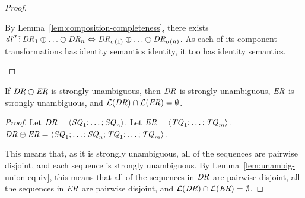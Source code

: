 \documentclass[numbers,10pt,preprint\ifanon ,nocopyrightspace\fi]{sigplanconf}
\begin{document}
\begin{proof}
\begin{case}[$j>0$]
    By Lemma~\ref{lem:composition-completeness},
    there exists $\mathit{dl}'' \,\tilde{:}\,
    \mathit{DR}_1 \oplus \ldots \oplus \mathit{DR}_n
    \Leftrightarrow
    \mathit{DR}_{\sigma(1)} \oplus \ldots \oplus \mathit{DR}_{\sigma(n)}$.
    As each of its component transformations has identity semantics identity,
    it too has identity semantics.
  \end{case}
\end{proof}

\begin{lemma}
  \label{lem:or-prop-subcomponent}
  If $\mathit{DR} \oplus \mathit{ER}$ is strongly unambiguous, then
  $\mathit{DR}$ is strongly unambiguous, $\mathit{ER}$ is strongly unambiguous,
  and $\mathcal{L}(\mathit{DR}) \cap \mathcal{L}(\mathit{ER}) = \emptyset$.
\end{lemma}
\begin{proof}
  Let $\mathit{DR} = \langle\mathit{SQ}_1;\ldots;\mathit{SQ}_n\rangle$.
  Let $\mathit{ER} = \langle\mathit{TQ}_1;\ldots;\mathit{TQ}_m\rangle$.
  $\mathit{DR} \oplus \mathit{ER} =
  \langle\mathit{SQ}_1;\ldots;\mathit{SQ}_n;\mathit{TQ}_1;\ldots;\mathit{TQ}_m\rangle$.

  This means that, as it is strongly unambiguous, all of the sequences are
  pairwise disjoint, and each sequence is strongly unambiguous.
  By Lemma~\ref{lem:unambig-union-equiv}, this means that
  all of the sequences in $\mathit{DR}$ are pairwise disjoint, all the sequences
  in $\mathit{ER}$ are pairwise disjoint, and
  $\mathcal{L}(\mathit{DR}) \cap \mathcal{L}(\mathit{ER}) = \emptyset$.
\end{proof}
\end{document}

